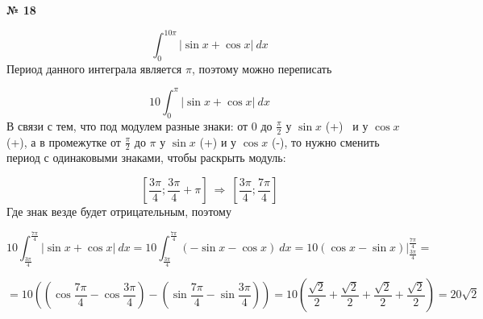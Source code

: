 \documentclass{article}
\begin{document}
\textbf{№ 18} 
\large

$$ \int_{0}^{10\pi} \left| \sin{x} + \cos{x} \right| \ dx $$
Период данного интеграла является $\pi$, поэтому можно переписать

$$ 10 \int_{0}^{\pi} \left| \sin{x} + \cos{x} \right| \ dx $$
В связи с тем, что под модулем разные знаки: от 0 до $\frac{\pi}{2}$ у $\sin{x}$ (+) \ и у $\cos{x}$ (+),
а в промежутке от $\frac{\pi}{2}$ до $\pi$ у $\sin{x}$ (+) и у $\cos{x}$ (-), 
то нужно сменить период с одинаковыми знаками, чтобы раскрыть модуль:

$$ [\frac{3\pi}{4};  \frac{3\pi}{4} + \pi] \ \Rightarrow \ [\frac{3\pi}{4};\frac{7\pi}{4}] $$
Где знак везде будет отрицательным, поэтому

$$ 10 \int_{\frac{3\pi}{4}}^{\frac{7\pi}{4}} \left| \sin{x} + \cos{x} \right| \ dx 
= 10 \int_{\frac{3\pi}{4}}^{\frac{7\pi}{4}} \left( - \sin{x} - \cos{x} \right) \ dx 
= 10 \left( \cos{x} - \sin{x} \right) \bigg\vert_{\frac{3\pi}{4}}^{\frac{7\pi}{4}} 
= $$

$$ = 10 \left( \left( \cos{\frac{7\pi}{4}} - \cos{\frac{3\pi}{4}} \right) - \left( \sin{\frac{7\pi}{4}} - \sin{\frac{3\pi}{4}} \right) \right)
= 10\left( \frac{\sqrt{2}}{2} + \frac{\sqrt{2}}{2} + \frac{\sqrt{2}}{2} + \frac{\sqrt{2}}{2} \right)
= 20 \sqrt{2} $$
\end{document}

